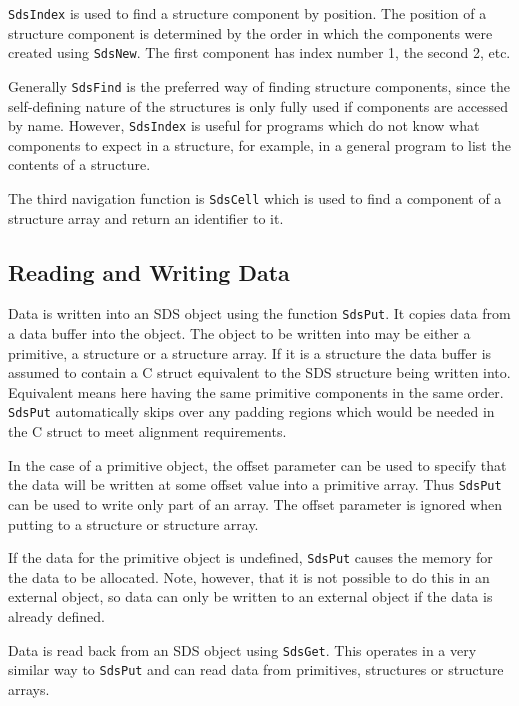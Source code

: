 \verb$SdsIndex$ is used to find a structure component by position. The position
of a structure component is determined by the order in which the components
were created using \verb$SdsNew$. The first component has index number 1, the
second 2, etc. 

Generally \verb$SdsFind$ is the preferred way of finding structure components,
since the self-defining nature of the structures is only fully used if
components are accessed by name. However, \verb$SdsIndex$ is useful for
programs which do not know what components to expect in a structure, for
example, in a general program to list the contents of a structure.

The third navigation function is \verb$SdsCell$ which is used to find a
component of a structure array and return an identifier to it.

\subsection{Reading and Writing Data}

Data is written into an SDS object using the function \verb$SdsPut$. It copies
data from a data buffer into the object. The object to be written into may be
either a primitive, a structure or a structure array. If it is a structure the
data buffer is assumed to contain a C struct equivalent to the SDS structure
being written into. Equivalent means here having the same primitive components
in the same order. \verb$SdsPut$ automatically skips over any padding regions
which would be needed in the C struct to meet alignment requirements.

In the case of a primitive object, the offset parameter can be used to specify
that the data will be written at some offset value into a primitive array. Thus
\verb$SdsPut$ can be used to write only part of an array. The offset parameter
is ignored when putting to a structure or structure array.

If the data for the primitive object is undefined, \verb$SdsPut$ causes the
memory for the data to be allocated. Note, however, that it is not possible to
do this in an external object, so data can only be written to an external
object if the data is already defined.

Data is read back from an SDS object using \verb$SdsGet$. This operates in a
very similar way to \verb$SdsPut$ and can read data from primitives, structures
or structure arrays.

